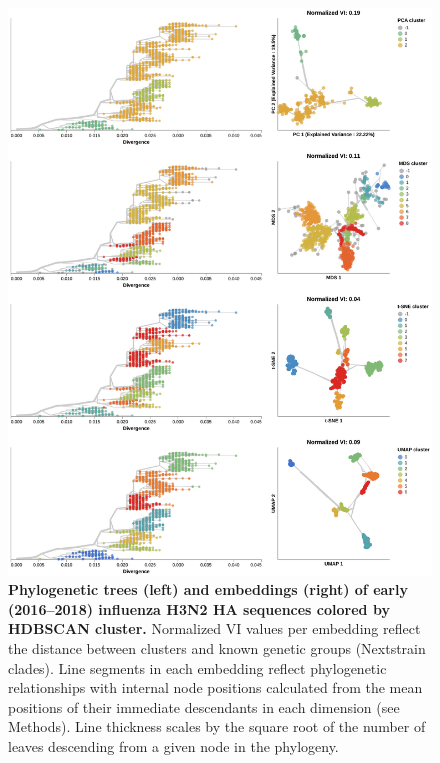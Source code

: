 \documentclass[10pt,letterpaper]{article}
\begin{document}
\begin{figure}[!h]
\includegraphics[width=\columnwidth]{figures/flu-2016-2018-ha-embeddings-by-cluster.png}
\caption{{\bf Phylogenetic trees (left) and embeddings (right) of early (2016--2018) influenza H3N2 HA sequences colored by HDBSCAN cluster.}
  Normalized VI values per embedding reflect the distance between clusters and known genetic groups (Nextstrain clades).
  Line segments in each embedding reflect phylogenetic relationships with internal node positions calculated from the mean positions of their immediate descendants in each dimension (see Methods).
  Line thickness scales by the square root of the number of leaves descending from a given node in the phylogeny.}
\label{fig:seasonal-influenza-h3n2-ha-2016-2018-clusters}
\end{figure}
\end{document}
